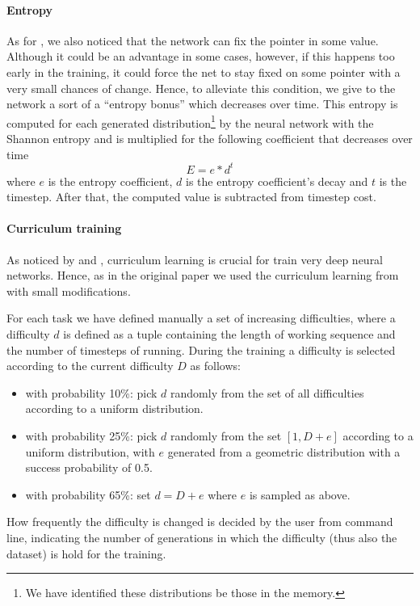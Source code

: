 \paragraph{Entropy}
As for \cite{NRAM:2016}, we also noticed that the network can fix the pointer in some value. Although it could be an advantage in some cases, however, if this happens too early in the training, it could force the net to stay fixed on some pointer with a very small chances of change. Hence, to alleviate this condition, we give to the network a sort of a ``entropy bonus'' which decreases over time. This entropy is computed for each generated distribution\footnote{We have identified these distributions be those in the memory.} by the neural network with the Shannon entropy and is multiplied for the following coefficient that decreases over time
\begin{equation}
	E = e * d^{t}
\end{equation}
where $e$ is the entropy coefficient, $d$ is the entropy coefficient's decay and $t$ is the timestep. After that, the computed value is subtracted from timestep cost.

\paragraph{Curriculum training}
As noticed by \cite{Bengio2009CurriculumL} and \cite{Zaremba2014LearningTE}, curriculum learning is crucial for train very deep neural networks. Hence, as in the original paper we used the curriculum learning from \cite{Zaremba2014LearningTE} with small modifications.

For each task we have defined manually a set of increasing difficulties, where a difficulty $d$ is defined as a tuple containing the length of working sequence and the number of timesteps of running. During the training a difficulty is selected according to the current difficulty $D$ as follows:
\begin{itemize}
	\item{with probability 10\%: pick $d$ randomly from the set of all difficulties according to a uniform distribution.}
	\item{with probability 25\%: pick $d$ randomly from the set $[1, D + e]$ according to a uniform distribution, with $e$ generated from a geometric distribution with a success probability of 0.5.}
	\item{with probability 65\%: set $d = D + e$ where $e$ is sampled as above.}
\end{itemize}
How frequently the difficulty is changed is decided by the user from command line, indicating the number of generations in which the difficulty (thus also the dataset) is hold for the training.

